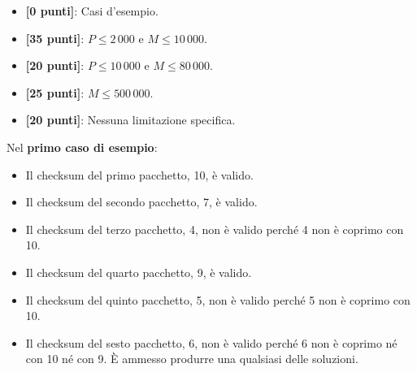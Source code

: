 \begin{itemize}[nolistsep,itemsep=2mm]
  \item \textbf{ [\phantom{0}0 punti]}: Casi d'esempio.
  \item \textbf{ [35 punti]}: $P \le 2\,000$ e $M \le 10\,000$.
  \item \textbf{ [20 punti]}: $P \le 10\,000$ e $M \le 80\,000$.
  \item \textbf{ [25 punti]}: $M \le 500\,000$.
  \item \textbf{ [20 punti]}: Nessuna limitazione specifica.
\end{itemize}



\Examples

\begin{example}
%
%
\end{example}


\Explanation

Nel \textbf{primo caso di esempio}:
\begin{itemize}
    \item Il checksum del primo pacchetto, 10, è valido.
    \item Il checksum del secondo pacchetto, 7, è valido.
    \item Il checksum del terzo pacchetto, 4, non è valido perché 4 non è coprimo con 10.
    \item Il checksum del quarto pacchetto, 9, è valido.
    \item Il checksum del quinto pacchetto, 5, non è valido perché 5 non è coprimo con 10.
    \item Il checksum del sesto pacchetto, 6, non è valido perché 6 non è coprimo né con 10 né con 9. È ammesso produrre una qualsiasi delle soluzioni.
\end{itemize}

